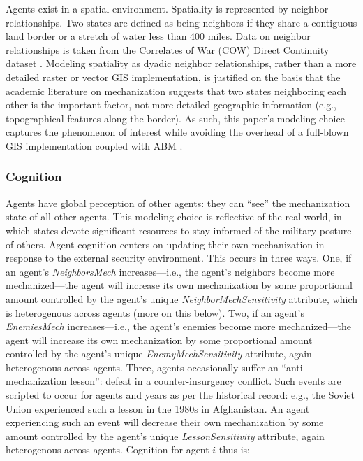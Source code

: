 \documentclass{article}
\begin{document}
Agents exist in a spatial environment. Spatiality is represented by neighbor
relationships. Two states are defined as
being neighbors if they share a contiguous land border or a stretch of water
less than 400 miles. Data on neighbor relationships is taken from the Correlates
of War (COW) Direct Continuity dataset \citep{cow_contiguity}.
Modeling spatiality as dyadic neighbor relationships, rather than a more
detailed raster or vector GIS implementation, is justified on the basis that the
academic literature on mechanization suggests that two states neighboring each
other is the important factor, not more detailed geographic information (e.g.,
topographical features along the border). As such, this paper's modeling choice
captures the phenomenon of interest while avoiding the overhead of a full-blown
GIS implementation coupled with ABM \citep[e.g.][]{harper2002modeling,bennett2006modelling}.

\subsubsection{Cognition}

Agents have global perception of other agents: they can ``see'' the
mechanization state of all other agents. This modeling choice is reflective of
the real world, in which states devote significant resources to stay informed of
the military posture of others. Agent cognition centers on 
updating their own mechanization in response to the external security
environment. This occurs in three ways. One, if an agent's
\textit{NeighborsMech} increases---i.e., the agent's neighbors become more
mechanized---the agent will increase its own mechanization by some proportional
amount controlled by the agent's unique \textit{NeighborMechSensitivity}
attribute, which is heterogenous across agents (more on this below).
Two, if an agent's
\textit{EnemiesMech} increases---i.e., the agent's enemies become more
mechanized---the agent will increase its own mechanization by some proportional
amount controlled by the agent's unique \textit{EnemyMechSensitivity} attribute,
again heterogenous across agents. Three,
agents occasionally suffer an ``anti-mechanization lesson'': defeat in a
counter-insurgency conflict. Such events are scripted to occur for agents and
years as per the historical record: e.g., the Soviet Union experienced such a
lesson in the 1980s in Afghanistan. An agent experiencing such an event will
decrease their own mechanization by some amount controlled by the agent's
unique \textit{LessonSensitivity} attribute, again heterogenous across agents.
Cognition for agent $i$ thus is:
\end{document}
